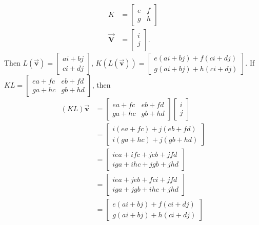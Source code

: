 \documentclass{report}
\begin{document}
\begin{itemize}
\begin{align*}
                K &= \begin{bmatrix} e & f \\ g& h\end{bmatrix} \\
                \vec{\mathbf{V}} &= \begin{bmatrix} i \\ j \end{bmatrix}
            .\end{align*}
            \bigbreak \noindent 
            Then $L(\vec{\mathbf{v}}) = \begin{bmatrix} ai + bj \\ ci + dj\end{bmatrix} $, $K(L(\vec{\mathbf{v}})) = \begin{bmatrix} e(ai + bj) + f(ci + dj) \\ g(ai + bj)  + h (ci + dj) \end{bmatrix}$. If $KL = \begin{bmatrix} ea + fc & eb + fd \\ ga + hc  & gb + hd \end{bmatrix}$, then
            \begin{align*}
                (KL)\vec{\mathbf{v}} &= \begin{bmatrix} ea + fc & eb + fd \\ ga + hc  & gb + hd \end{bmatrix} \begin{bmatrix} i \\ j \end{bmatrix} \\
                                     &= \begin{bmatrix} i(ea + fc) +  j(eb + fd) \\ i(ga + hc) + j(gb+hd) \end{bmatrix} \\
                                     &= \begin{bmatrix} iea + ifc  + jeb + jfd \\ iga + ihc + jgb + jhd\end{bmatrix}  \\
                                     &= \begin{bmatrix} iea + jeb + fci + jfd \\ iga + jgb + ihc + jhd\end{bmatrix}  \\
                                     &= \begin{bmatrix} e(ai + bj) + f(ci + dj) \\ g(ai + bj)  + h(ci + dj)\end{bmatrix} 

\end{align*}
\end{itemize}
\end{document}
